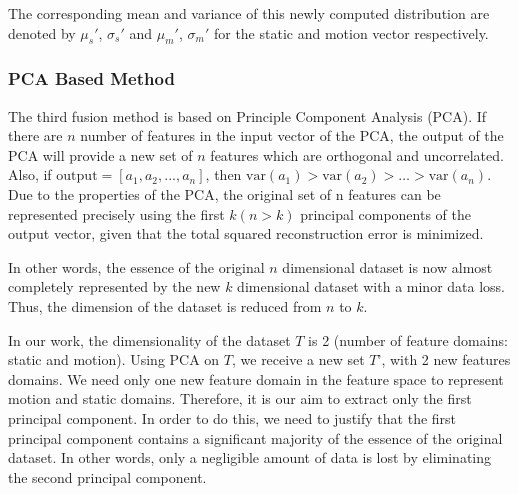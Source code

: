 The corresponding mean and variance of this newly computed distribution are denoted by $\mu_s'$, $\sigma_s'$ and $\mu_m'$, $\sigma_m'$ for the static and motion vector respectively.

\subsubsection{PCA Based Method}

The third fusion method is based on Principle Component Analysis (PCA). %
If there are $n$ number of features in the input vector of the PCA, the output of the
PCA will provide a new set of $n$ features which are orthogonal and uncorrelated. Also, if
$\mathrm{output} =[a_{1}, a_{2}, ..., a_{n}]$, then $\mathrm{var}(a_{1})> \mathrm{var}(a_{2})> \dots > \mathrm{var} (a_{n})$.
Due to the properties of the PCA, the original set of n features can be
represented precisely using the first $k (n>k)$ principal
components of the output vector, given that the total squared reconstruction error
is minimized.

In other words, the essence of the original $n$ dimensional dataset is now almost
completely represented by the new $k$ dimensional dataset with a minor data loss. Thus, the
dimension of the dataset is reduced from $n$ to $k$.


In our work, the dimensionality of the dataset $T$ is 2 (number of feature domains: static
and motion).
Using PCA on $T$, we receive a new set $T$', with 2 new features domains. We need only one new feature
domain in the feature space to
represent motion and static domains. Therefore, it is our aim to extract only the first principal component.
In order to do this, we need to justify that the first principal component contains a significant majority of
the essence of the original dataset. In other words, only a negligible amount of data is lost by
eliminating the second principal component.

